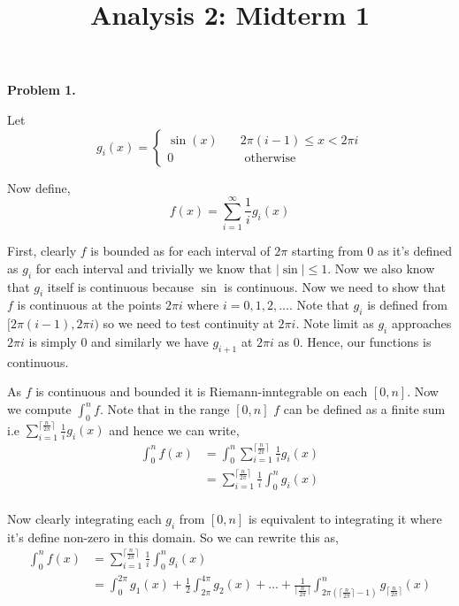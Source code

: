 \documentclass[a4paper]{article}
\title{Analysis 2: Midterm 1}
\begin{document}
\maketitle
\textbf{Problem 1.}

\vspace{1em}
Let $$g_i(x) = \begin{cases}
    \sin(x) \quad &2\pi (i - 1) \le x < 2\pi i\\
    0 \quad & \text{ otherwise }
\end{cases}$$

Now define,
\[
    f(x) = \sum_{i = 1}^{\infty} \frac{1}{i} g_i(x)
\]


First, clearly $f$ is bounded as for each interval of $2\pi$ starting from $0$ as it's defined as $g_i$ for each interval and trivially we know that $|\sin| \le 1$. Now we also know that $g_i$ itself is continuous because $\sin$ is continuous. Now we need to show that $f$ is continuous at the points $2\pi i$ where $i = 0, 1, 2, \dots$. Note that $g_i$ is defined from $[2\pi (i - 1), 2\pi i)$ so we need to test continuity at $2\pi i$. Note limit as $g_i$ approaches $2 \pi i$ is simply $0$ and similarly we have $g_{i+1}$ at $2\pi i$ as $0$. Hence, our functions is continuous.

\vspace{1em}

As $f$ is continuous and bounded it is Riemann-inntegrable on each $[0, n]$. Now we compute $\int_0^{n} f$. Note that in the range $[0, n]$ $f$ can be defined as a finite sum i.e $\sum_{i = 1}^{\lceil\frac{n}{2\pi} \rceil}\frac{1}{i}g_i(x)$ and hence we can write, 
\begin{align*}
    \int_{0}^{n} f(x) &= \int_{0}^{n} \sum_{i = 1}^{\lceil \frac{n}{2\pi} \rceil} \frac{1}{i} g_i(x)\\
                      &= \sum_{i = 1}^{\lceil \frac{n}{2\pi} \rceil} \frac{1}{i} \int_{0}^{n} g_i(x)\\
\end{align*}

Now clearly integrating each $g_i$ from $[0, n]$ is equivalent to integrating it where it's define non-zero in this domain. So we can rewrite this as,
\begin{align*}
    \int_{0}^{n} f(x) &= \sum_{i = 1}^{\lceil\frac{n}{2\pi}\rceil} \frac{1}{i} \int_{0}^{n} g_i(x)\\
                      &= \int_{0}^{2\pi} g_1(x) + \frac{1}{2} \int_{2\pi}^{4\pi} g_2(x) + \dots + \frac{1}{\lceil\frac{n}{2\pi}\rceil} \int_{2\pi (\lceil\frac{n}{2\pi}\rceil - 1)}^{n}  g_{\lceil\frac{n}{2\pi}\rceil}(x)
\end{align*}
\end{document}
